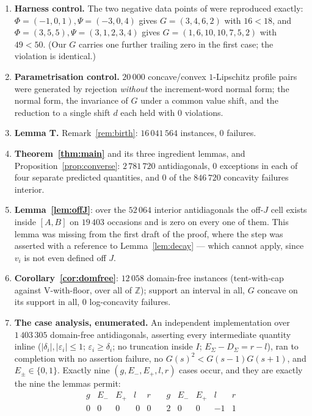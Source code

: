 \documentclass[11pt]{article}
\theoremstyle{definition}
\newcommand{\Z}{\mathbb{Z}}
\begin{document}
\begin{enumerate}
\item \textbf{Harness control.} The two negative data points of \cite[Rem.~4.5]{c1} were
reproduced exactly: $\Phi=(-1,0,1),\Psi=(-3,0,4)$ gives $G=(3,4,6,2)$ with $16<18$, and
$\Phi=(3,5,5),\Psi=(3,1,2,3,4)$ gives $G=(1,6,10,10,7,5,2)$ with $49<50$. (Our $G$
carries one further trailing zero in the first case; the violation is identical.)
\item \textbf{Parametrisation control.} $20\,000$ concave/convex $1$-Lipschitz profile
pairs were generated by rejection \emph{without} the increment-word normal form; the
normal form, the invariance of $G$ under a common value shift, and the reduction to a
single shift $d$ each held with $0$ violations.
\item \textbf{Lemma T.} Remark~\ref{rem:birth}: $16\,041\,564$ instances, $0$ failures.
\item \textbf{Theorem~\ref{thm:main}} and its three ingredient lemmas, and
Proposition~\ref{prop:converse}: $2\,781\,720$ antidiagonals, $0$ exceptions in each of
four separate predicted quantities, and $0$ of the $846\,720$ concavity failures
interior.
\item \textbf{Lemma~\ref{lem:offJ}}: over the $52\,064$ interior antidiagonals the
off-$J$ cell exists inside $[A,B]$ on $19\,403$ occasions and is zero on every one of
them. This lemma was missing from the first draft of the proof, where the step was
asserted with a reference to Lemma~\ref{lem:decay} --- which cannot apply, since $v_i$ is
not even defined off $J$.
\item \textbf{Corollary~\ref{cor:domfree}}: $12\,058$ domain-free instances (tent-with-cap
against V-with-floor, over all of $\Z$); support an interval in all, $G$ concave on its
support in all, $0$ log-concavity failures.
\item \textbf{The case analysis, enumerated.} An independent implementation over
$1\,403\,305$ domain-free antidiagonals, asserting every intermediate quantity inline
($|\delta_i|,|\varepsilon_i|\le1$; $\varepsilon_i\ge\delta_i$; no truncation inside $I$;
$E_\Sigma-D_\Sigma=r-l$), ran to completion with no assertion failure, no
$G(s)^2<G(s-1)G(s+1)$, and $E_\pm\in\{0,1\}$. Exactly nine $(g,E_-,E_+,l,r)$ cases occur,
and they are exactly the nine the lemmas permit:
\[
\begin{array}{ccccr|ccccr}
g & E_- & E_+ & l & r & g & E_- & E_+ & l & r\\\hline
0&0&0&\ 0&0 \quad& 2&0&0&-1&1\\

\end{array}\]
\end{enumerate}
\end{document}
